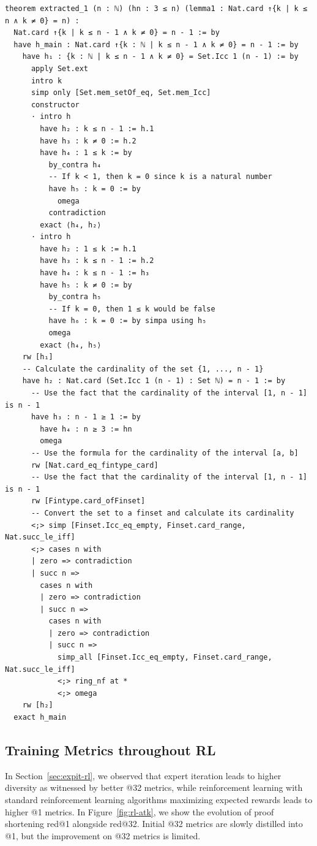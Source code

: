 \begin{tcolorbox}[colback=lightblue, boxrule=0pt, arc=5pt, outer arc=5pt, after skip=10pt plus 2pt]
\begin{lstlisting}[caption={Example of Proof Simplification Training Task (Length 295)},label={lst:proof-simp-training-ex2}, captionpos=t, language=lean, breaklines=true, style=mystyle]
theorem extracted_1 (n : ℕ) (hn : 3 ≤ n) (lemma1 : Nat.card ↑{k | k ≤ n ∧ k ≠ 0} = n) :
  Nat.card ↑{k | k ≤ n - 1 ∧ k ≠ 0} = n - 1 := by
  have h_main : Nat.card ↑{k : ℕ | k ≤ n - 1 ∧ k ≠ 0} = n - 1 := by
    have h₁ : {k : ℕ | k ≤ n - 1 ∧ k ≠ 0} = Set.Icc 1 (n - 1) := by
      apply Set.ext
      intro k
      simp only [Set.mem_setOf_eq, Set.mem_Icc]
      constructor
      · intro h
        have h₂ : k ≤ n - 1 := h.1
        have h₃ : k ≠ 0 := h.2
        have h₄ : 1 ≤ k := by
          by_contra h₄
          -- If k < 1, then k = 0 since k is a natural number
          have h₅ : k = 0 := by
            omega
          contradiction
        exact ⟨h₄, h₂⟩
      · intro h
        have h₂ : 1 ≤ k := h.1
        have h₃ : k ≤ n - 1 := h.2
        have h₄ : k ≤ n - 1 := h₃
        have h₅ : k ≠ 0 := by
          by_contra h₅
          -- If k = 0, then 1 ≤ k would be false
          have h₆ : k = 0 := by simpa using h₅
          omega
        exact ⟨h₄, h₅⟩
    rw [h₁]
    -- Calculate the cardinality of the set {1, ..., n - 1}
    have h₂ : Nat.card (Set.Icc 1 (n - 1) : Set ℕ) = n - 1 := by
      -- Use the fact that the cardinality of the interval [1, n - 1] is n - 1
      have h₃ : n - 1 ≥ 1 := by
        have h₄ : n ≥ 3 := hn
        omega
      -- Use the formula for the cardinality of the interval [a, b]
      rw [Nat.card_eq_fintype_card]
      -- Use the fact that the cardinality of the interval [1, n - 1] is n - 1
      rw [Fintype.card_ofFinset]
      -- Convert the set to a finset and calculate its cardinality
      <;> simp [Finset.Icc_eq_empty, Finset.card_range, Nat.succ_le_iff]
      <;> cases n with
      | zero => contradiction
      | succ n =>
        cases n with
        | zero => contradiction
        | succ n =>
          cases n with
          | zero => contradiction
          | succ n =>
            simp_all [Finset.Icc_eq_empty, Finset.card_range, Nat.succ_le_iff]
            <;> ring_nf at *
            <;> omega
    rw [h₂]
  exact h_main
\end{lstlisting}
\end{tcolorbox}

\newpage
\subsection{Training Metrics throughout RL} \label{sec:rl-metrics-all}
In Section~\ref{sec:expit-rl}, we observed that expert iteration leads to higher diversity as witnessed by better @32 metrics, while reinforcement learning with standard reinforcement learning algorithms maximizing expected rewards leads to higher @1 metrics. In Figure~\ref{fig:rl-atk}, we show the evolution of proof shortening red@1 alongside red@32. Initial @32 metrics are slowly distilled into @1, but the improvement on @32 metrics is limited.

